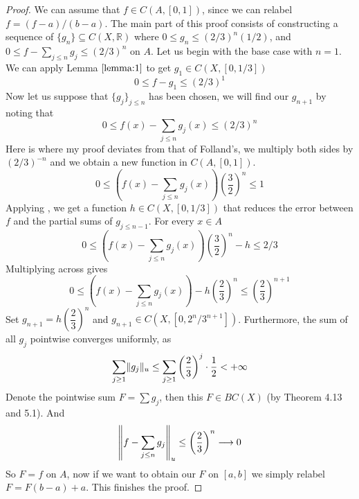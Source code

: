 \documentclass[../../main.tex]{subfiles}
\begin{document}
\begin{proof}
We can assume that $f\in C(A,[0,1])$, since we can relabel $f = (f-a)/(b-a)$. The main part of this proof consists of constructing a sequence of $\{g_n\}\subseteq C(X,\mathbb{R})$ where $0\leq g_n\leq (2/3)^n(1/2)$, and $0\leq f-\sum_{j\leq n}g_j\leq (2/3)^n$ on $A$. Let us begin with the base case with $n=1$. We can apply Lemma $\ref{lemma:1}$ to get $g_1\in C(X,[0,1/3])$
\[
0\leq f-g_1\leq (2/3)^1
\]
Now let us suppose that $\{g_j\}_{j\leq n}$ has been chosen, we will find our $g_{n+1}$ by noting that
\[
0\leq f(x)-\sum_{j\leq n}g_j(x)\leq (2/3)^n
\]
Here is where my proof deviates from that of Folland's, we multiply both sides by $(2/3)^{-n}$ and we obtain a new function in $C(A,[0,1])$.
\[
0\leq \left(f(x)-\sum_{j\leq n}g_j(x)\right)\left(\dfrac{3}{2}\right)^n\leq 1
\]
Applying , we get a function $h\in C(X,[0,1/3])$ that reduces the error between $f$ and the partial sums of $g_{j\leq n-1}$. For every $x\in A$
\[
0\leq \left(f(x)-\sum_{j\leq n}g_j(x)\right)\left(\dfrac{3}{2}\right)^n-h\leq 2/3
\]
Multiplying across gives
\[
0\leq \left(f(x)-\sum_{j\leq n}g_j(x)\right)-h\left(\dfrac{2}{3}\right)^n\leq \left(\dfrac{2}{3}\right)^{n+1}
\]
Set $g_{n+1} = h\left(\dfrac{2}{3}\right)^n$ and $g_{n+1}\in C(X, [0, 2^n/3^{n+1}])$. Furthermore, the sum of all $g_j$ pointwise converges uniformly, as
\[
\sum_{j\geq 1} \lVert {g_j} \rVert_u \leq \sum_{j\geq 1}\left(\dfrac{2}{3}\right)^j\cdot\dfrac{1}{2}<+\infty
\]
Denote the pointwise sum $F = \sum g_j$, then this $F\in BC(X)$ (by Theorem 4.13 and 5.1). And
\[
\left\lVert {f-\sum_{j\leq n}g_j} \right\rVert_u\leq \left(\dfrac{2}{3}\right)^n\longrightarrow 0
\]
So $F= f$ on $A$, now if we want to obtain our $F$ on $[a,b]$ we simply relabel $F = F(b-a) + a$. This finishes the proof.
\end{proof}
\end{document}
